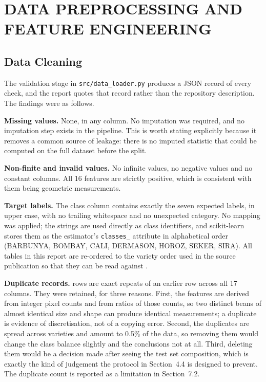 \chapter{DATA PREPROCESSING AND FEATURE ENGINEERING}

\section{Data Cleaning}

The validation stage in \texttt{src/data\_loader.py} produces a JSON record of
every check, and the report quotes that record rather than the repository
description. The findings were as follows.

\textbf{Missing values.} None, in any column. No imputation was required, and no
imputation step exists in the pipeline. This is worth stating explicitly because
it removes a common source of leakage: there is no imputed statistic that could
be computed on the full dataset before the split.

\textbf{Non-finite and invalid values.} No infinite values, no negative values
and no constant columns. All 16 features are strictly positive, which is
consistent with them being geometric measurements.

\textbf{Target labels.} The class column contains exactly the seven expected
labels, in upper case, with no trailing whitespace and no unexpected category.
No mapping was applied; the strings are used directly as class identifiers, and
scikit-learn stores them as the estimator's \texttt{classes\_} attribute in
alphabetical order (BARBUNYA, BOMBAY, CALI, DERMASON, HOROZ, SEKER, SIRA). All
tables in this report are re-ordered to the variety order used in the source
publication so that they can be read against \cite{koklu2020}.

\textbf{Duplicate records.} \DuplicateRows{} rows are exact repeats of an earlier
row across all 17 columns. They were retained, for three reasons. First, the
features are derived from integer pixel counts and from ratios of those counts,
so two distinct beans of almost identical size and shape can produce identical
measurements; a duplicate is evidence of discretisation, not of a copying error.
Second, the duplicates are spread across varieties and amount to 0.5\% of the
data, so removing them would change the class balance slightly and the conclusions
not at all. Third, deleting them would be a decision made after seeing the test
set composition, which is exactly the kind of judgement the protocol in
Section~4.4 is designed to prevent. The duplicate count is reported as a
limitation in Section~7.2.


